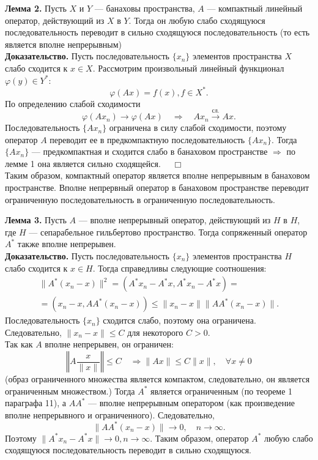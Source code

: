 \documentclass[12pt,a4paper, titlepage]{article}
\begin{document}
\textbf{Лемма 2.} Пусть $X$ и $Y$ --- банаховы пространства, $A$ --- компактный линейный оператор, действующий из $X$ в $Y$.
Тогда он любую слабо сходящуюся последовательность переводит в сильно сходящуюся последовательность (то есть является вполне непрерывным)%
\\
\textbf{Доказательство.} Пусть последовательность $\{x_n\}$ элементов пространства $X$ слабо сходится к $x \in X$. Рассмотрим произвольный линейный функционал $\varphi (y) \in Y^*$:
$$
\varphi (Ax) = f(x), f \in X^*.
$$
По определению слабой сходимости
$$
\varphi (Ax_n) \to \varphi (Ax) \quad \Rightarrow \quad Ax_n \xrightarrow{\text{сл.}} Ax.
$$
Последовательность $\{Ax_n\}$ ограничена в силу слабой сходимости, поэтому оператор $A$ переводит ее в предкомпактную последовательность $\{Ax_n\}$. Тогда $\{Ax_n\}$ --- предкомпактная и сходится слабо в банаховом пространстве $\Rightarrow$ по лемме 1 она является сильно сходящейся. $\quad \Box$\\

Таким образом, компактный оператор является вполне непрерывным в банаховом пространстве.
Вполне непрервный оператор в банаховом пространстве переводит ограниченную последовательность в ограниченную последовательность.

\textbf{Лемма 3.} Пусть $A$ --- вполне непрерывный оператор, действующий из $H$ в $H$, где $H$ --- сепарабельное гильбертово пространство. Тогда сопряженный оператор $A^*$ также вполне непрерывен.\\
\textbf{Доказательство.} Пусть последовательность $\{x_n\}$ элементов пространства $H$ слабо сходится к $x \in H$. Тогда справедливы следующие соотношения:
\begin{multline*}
\|A^*(x_n - x)\|^2 = (A^*x_n - A^*x, A^*x_n - A^*x) = \\
= (x_n - x, AA^*(x_n - x)) \leqslant \|x_n - x\| \|AA^* (x_n - x)\|.
\end{multline*}
Последовательность $\{x_n\}$ сходится слабо, поэтому она ограничена. Следовательно, $\|x_n - x\| \leqslant C$ для некоторого $C > 0$.\\

Так как $A$ вполне непрерывен, он ограничен:
$$
\left\Vert A \frac{x}{\|x\|} \right\Vert \leqslant C \quad \Rightarrow \|Ax\| \leqslant C\|x\|, \quad \forall x \neq 0
$$
(образ ограниченного множества является компактом, следовательно, он является ограниченным множеством.)
Тогда $A^*$ является ограниченным (по теореме 1 параграфа 11), а $AA^*$ --- вполне непрерывным оператором (как произведение вполне непрерывного и ограниченного). Следовательно,
$$
\|AA^*(x_n - x)\| \to 0, \quad n \to \infty.
$$
Поэтому $\|A^*x_n - A^*x\| \to 0, n \to \infty$. Таким образом, оператор $A^*$ любую слабо сходящуюся последовательность переводит в сильно сходящуюся.\\
\end{document}
